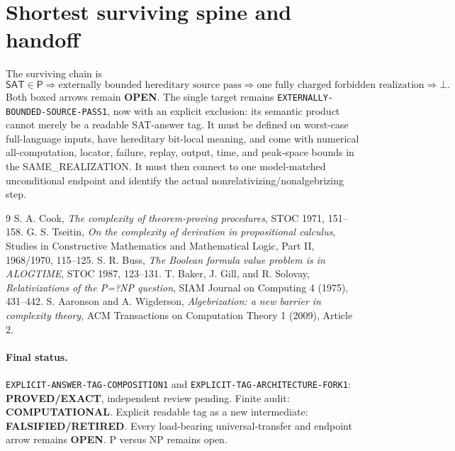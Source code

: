 \documentclass[11pt]{article}
\newcommand{\SAT}{\mathsf{SAT}}
\newcommand{\Pclass}{\mathsf P}
\newcommand{\EXACT}{\textbf{PROVED/EXACT}}
\newcommand{\COMP}{\textbf{COMPUTATIONAL}}
\newcommand{\OPEN}{\textbf{OPEN}}
\newcommand{\RETIRED}{\textbf{FALSIFIED/RETIRED}}
\begin{document}
\section{Shortest surviving spine and handoff}

The surviving chain is
\[
 \SAT\in\Pclass
 \Longrightarrow
 \boxed{\text{externally bounded hereditary source pass}}
 \Longrightarrow
 \boxed{\text{one fully charged forbidden realization}}
 \Longrightarrow\bot .                                      \tag{4}
\]
Both boxed arrows remain \OPEN.  The single target remains
\texttt{EXTERNALLY-BOUNDED-SOURCE-PASS1}, now with an explicit exclusion:
its semantic product cannot merely be a readable SAT-answer tag.  It must be
defined on worst-case full-language inputs, have hereditary bit-local meaning,
and come with numerical all-computation, locator, failure, replay, output,
time, and peak-space bounds in the SAME\_REALIZATION.  It must then connect to
one model-matched unconditional endpoint and identify the actual
nonrelativizing/nonalgebrizing step.

\begin{thebibliography}{9}
 S. A. Cook, \emph{The complexity of theorem-proving
procedures}, STOC 1971, 151--158.
 G. S. Tseitin, \emph{On the complexity of derivation in
propositional calculus}, Studies in Constructive Mathematics and Mathematical
Logic, Part II, 1968/1970, 115--125.
 S. R. Buss, \emph{The Boolean formula value problem is in
ALOGTIME}, STOC 1987, 123--131.
 T. Baker, J. Gill, and R. Solovay,
\emph{Relativizations of the P=?NP question}, SIAM Journal on Computing 4
(1975), 431--442.
 S. Aaronson and A. Wigderson, \emph{Algebrization: a new
barrier in complexity theory}, ACM Transactions on Computation Theory 1
(2009), Article 2.
\end{thebibliography}

\paragraph{Final status.}
\texttt{EXPLICIT-ANSWER-TAG-COMPOSITION1} and
\texttt{EXPLICIT-TAG-ARCHITECTURE-FORK1}: \EXACT, independent review
pending.  Finite audit: \COMP.  Explicit readable tag as a new intermediate:
\RETIRED.  Every load-bearing universal-transfer and endpoint arrow remains
\OPEN.  P versus NP remains open.
\end{document}
